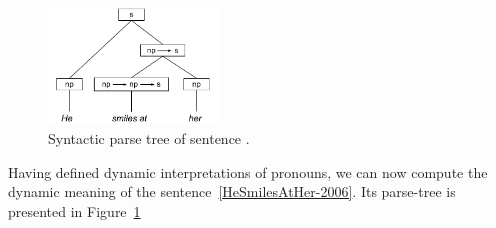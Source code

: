 \begin{figure}[h]
 \centering
    \includegraphics[width=0.4\textwidth]{images/HeSmilesatHer.pdf}
\caption{Syntactic parse tree of sentence .} \label{fig:ptS3-2006}
\end{figure}

Having defined dynamic interpretations of pronouns, we can now compute the dynamic meaning of the sentence~\eqref{HeSmilesAtHer-2006}. Its parse-tree is presented in Figure~\ref{fig:ptS3-2006} 


